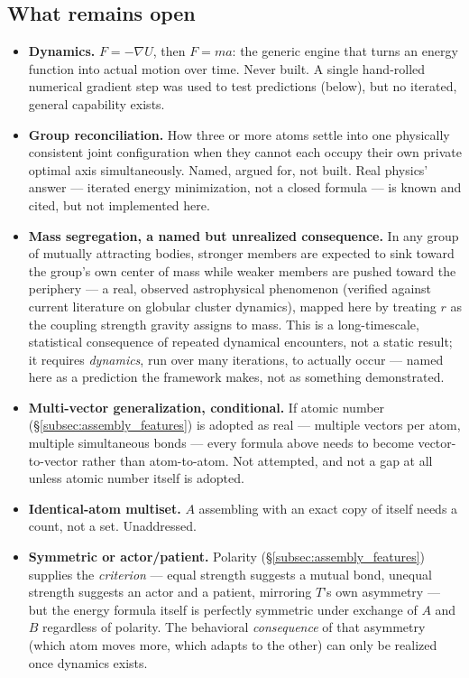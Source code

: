\documentclass[12pt, a4paper]{article}
\begin{document}
\subsection{What remains open}
\label{subsec:assembly_open}
\begin{itemize}
\item \textbf{Dynamics.} $F=-\nabla U$, then $F=ma$: the generic
      engine that turns an energy function into actual motion over
      time. Never built. A single hand-rolled numerical gradient
      step was used to test predictions (below), but no iterated,
      general capability exists.
\item \textbf{Group reconciliation.} How three or more atoms settle
      into one physically consistent joint configuration when they
      cannot each occupy their own private optimal axis
      simultaneously. Named, argued for, not built. Real physics'
      answer --- iterated energy minimization, not a closed formula
      --- is known and cited, but not implemented here.
\item \textbf{Mass segregation, a named but unrealized consequence.}
      In any group of mutually attracting bodies, stronger members
      are expected to sink toward the group's own center of mass
      while weaker members are pushed toward the periphery --- a
      real, observed astrophysical phenomenon (verified against
      current literature on globular cluster dynamics), mapped here
      by treating $r$ as the coupling strength gravity assigns to
      mass. This is a long-timescale, statistical consequence of
      repeated dynamical encounters, not a static result; it
      requires \emph{dynamics}, run over many iterations, to
      actually occur --- named here as a prediction the framework
      makes, not as something demonstrated.
\item \textbf{Multi-vector generalization, conditional.} If atomic
      number (\S\ref{subsec:assembly_features}) is adopted as real
      --- multiple vectors per atom, multiple simultaneous bonds ---
      every formula above needs to become vector-to-vector rather
      than atom-to-atom. Not attempted, and not a gap at all unless
      atomic number itself is adopted.
\item \textbf{Identical-atom multiset.} $A$ assembling with an exact
      copy of itself needs a count, not a set. Unaddressed.
\item \textbf{Symmetric or actor/patient.} Polarity
      (\S\ref{subsec:assembly_features}) supplies the
      \emph{criterion} --- equal strength suggests a mutual bond,
      unequal strength suggests an actor and a patient, mirroring
      $T$'s own asymmetry --- but the energy formula itself is
      perfectly symmetric under exchange of $A$ and $B$ regardless
      of polarity. The behavioral \emph{consequence} of that
      asymmetry (which atom moves more, which adapts to the other)
      can only be realized once dynamics exists.
\end{itemize}
\end{document}
